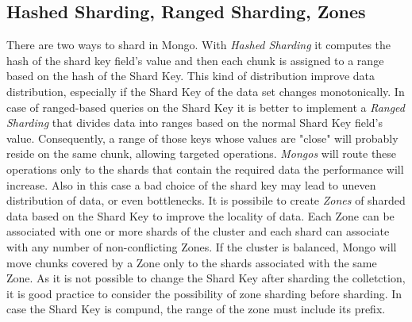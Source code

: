 \subsection{Hashed Sharding, Ranged Sharding, Zones}
There are two ways to shard in Mongo. With \textit{Hashed Sharding} it computes the hash of the shard key field's value and then each chunk is assigned to a range based on the hash of the Shard Key. This kind of distribution improve data distribution, especially if the Shard Key of the data set changes monotonically.
In case of ranged-based queries on the Shard Key it is better to implement a \textit{Ranged Sharding} that divides data into ranges based on the normal Shard Key field's value. Consequently, a range of those keys whose values are "close" will probably reside on the same chunk, allowing targeted operations. \textit{Mongos} will route these operations only to the shards that contain the required data the performance will increase.
Also in this case a bad choice of the shard key may lead to uneven distribution of data, or even bottlenecks.
It is possibile to create \textit{Zones} of sharded data based on the Shard Key to improve the locality of data. Each Zone can be associated with one or more shards of the cluster and each shard can associate with any number of non-conflicting Zones.
If the cluster is balanced, Mongo will move chunks covered by a Zone only to the shards associated with the same Zone. As it is not possible to change the Shard Key after sharding the colletction, it is good practice to consider the possibility of zone sharding before sharding. In case the Shard Key is compund, the range of the zone must include its prefix.





